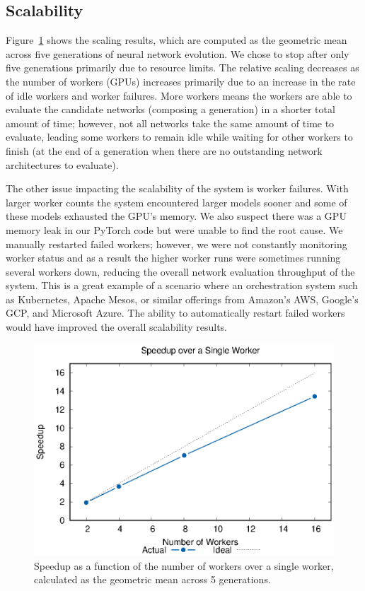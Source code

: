 \documentclass[conference]{IEEEtran}
\begin{document}
\subsection{Scalability}\label{sec:scalability}
Figure~\ref{fig:scale} shows the scaling results, which are computed as the
geometric mean across five generations of neural network evolution. We chose to
stop after only five generations primarily due to resource limits.  The relative
scaling decreases as the number of workers (GPUs) increases primarily due to an
increase in the rate of idle workers and worker failures. More workers means the
workers are able to evaluate the candidate networks (composing a generation) in
a shorter total amount of time; however, not all networks take the same amount
of time to evaluate, leading some workers to remain idle while waiting for other
workers to finish (at the end of a generation when there are no outstanding
network architectures to evaluate).

The other issue impacting the scalability of the system is worker failures. With
larger worker counts the system encountered larger models sooner and some of
these models exhausted the GPU's memory. We also suspect there was a GPU memory
leak in our PyTorch code but were unable to find the root cause. We manually
restarted failed workers; however, we were not constantly monitoring worker
status and as a result the higher worker runs were sometimes running several
workers down, reducing the overall network evaluation throughput of the
system. This is a great example of a scenario where an orchestration system such
as Kubernetes, Apache Mesos, or similar offerings from Amazon's AWS, Google's
GCP, and Microsoft Azure.  The ability to automatically restart failed workers
would have improved the overall scalability results.

\begin{figure}
  \centering
  \includegraphics[width=\columnwidth]{result/output/rates}
  \caption{Speedup as a function of the number of workers over a single worker,
    calculated as the geometric mean across 5 generations.}
  \label{fig:scale}
\end{figure}
\end{document}
